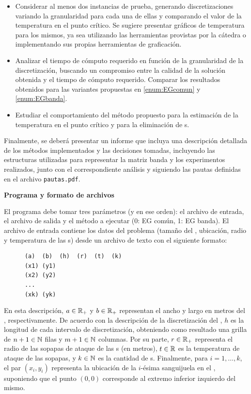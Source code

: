 \documentclass[spanish,a4paper]{article}
\begin{document}
\begin{itemize}
\item Considerar al menos dos instancias de prueba, generando discretizaciones variando la granularidad para cada una de ellas y comparando el valor de la temperatura en el punto cr\'itico. Se sugiere presentar gr\'aficos de temperatura para los mismos, ya sea utilizando las herramientas provistas por la c\'atedra o implementando sus propias herramientas de graficaci\'on. 
\item Analizar el tiempo de c\'omputo requerido en funci\'on de la granularidad de la discretizaci\'on, buscando un compromiso entre la calidad de la soluci\'on obtenida y el tiempo de c\'omputo requerido. Comparar los resultados obtenidos para las variantes propuestas en \ref{enum:EGcomun} y \ref{enum:EGbanda}. 
\item Estudiar el comportamiento del m\'etodo propuesto para la estimaci\'on de la temperatura en el punto cr\'itico y para la eliminaci\'on de \atacante s.
\end{itemize}

Finalmente, se deber\'a presentar un informe que incluya una descripci\'on detallada de los m\'etodos implementados y las decisiones tomadas, incluyendo las estructuras utilizadas para representar la matriz banda  y los experimentos realizados, junto con el correspondiente an\'alisis y siguiendo las pautas definidas en el archivo \verb+pautas.pdf+.

{\noindent \bf Programa y formato de archivos}

El programa debe tomar tres par\'ametros (y en ese orden): el archivo de entrada, el archivo de salida y el m\'etodo a ejecutar (0: EG com\'un, 1: EG banda).
El archivo de entrada contiene los datos del problema (tama\~no del
\objeto, ubicaci\'on, radio y temperatura de las \atacante s) desde un
archivo de texto con el siguiente formato:

\begin{verbatim}
      (a)  (b)  (h)  (r)  (t)  (k)
      (x1) (y1)
      (x2) (y2)
      ...
      (xk) (yk)
\end{verbatim}

En esta descripci\'on, $a\in\mathbb{R}_+$ y $b\in\mathbb{R}_+$ representan el ancho
y largo en metros del \objeto, respectivamente. De acuerdo con la descripci\'on
de la discretizaci\'on del \objeto, $h$ es la longitud de cada intervalo de discretizaci\'on,
obteniendo como resultado una grilla de $n+1\in\mathbb{N}$ filas y $m+1\in\mathbb{N}$ columnas.
Por su parte, $r\in\mathbb{R}_+$ representa el radio de las sopapas de ataque de las
\atacante s (en metros), $t\in\mathbb{R}$ es la temperatura de ataque de las sopapas,
y $k\in\mathbb{N}$ es la cantidad de \atacante s. Finalmente, para $i=1,\dots,k$,
el par $(x_i,y_i)$ representa la ubicaci\'on de la $i$-\'esima sanguijuela en el
\objeto, suponiendo que el punto $(0,0)$  corresponde al extremo inferior
izquierdo del mismo.
\end{document}
